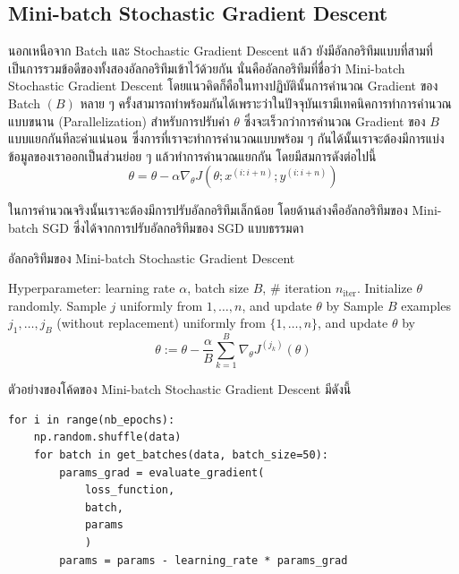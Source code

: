 \subsection{Mini-batch Stochastic Gradient Descent}
\label{ssec:minibatch_grad}

นอกเหนือจาก Batch และ Stochastic Gradient Descent แล้ว ยังมีอัลกอริทึมแบบที่สามที่เป็นการรวมข้อดีของทั้งสองอัลกอริทึมเข้าไว้ด้วยกัน นั่นคืออัลกอริทึมที่ชื่อว่า Mini-batch Stochastic Gradient Descent โดยแนวคิดก็คือในทางปฏิบัตินั้นการคำนวณ Gradient ของ Batch $(B)$ หลาย ๆ ครั้งสามารถทำพร้อมกันได้เพราะว่าในปัจจุบันเรามีเทคนิคการทำการคำนวณแบบขนาน (Parallelization) สำหรับการปรับค่า $\theta$ ซึ่งจะเร็วกว่าการคำนวณ Gradient ของ $B$ แบบแยกกันทีละค่าแน่นอน ซึ่งการที่เราจะทำการคำนวณแบบพร้อม ๆ กันได้นั้นเราจะต้องมีการแบ่งข้อมูลของเราออกเป็นส่วนย่อย ๆ แล้วทำการคำนวณแยกกัน โดยมีสมการดังต่อไปนี้
%
\begin{equation}\label{eq:minibatch}
    \theta = \theta - \alpha\nabla_\theta J( \theta; x^{(i:i+n)}; y^{(i:i+n)})
\end{equation}

ในการคำนวณจริงนั้นเราจะต้องมีการปรับอัลกอริทึมเล็กน้อย โดยด้านล่างคืออัลกอริทึมของ Mini-batch SGD ซึ่งได้จากการปรับอัลกอริทึมของ SGD แบบธรรมดา

\begin{algorithm}[H]
    \caption{อัลกอริทึมของ Mini-batch Stochastic Gradient Descent}
    \label{alg:minibatch}
    \begin{algorithmic}
        \State Hyperparameter: learning rate $\alpha$, batch size $B$, \# iteration $n_\text{iter}$.
        \State Initialize $\theta$ randomly.
        \State Sample $j$ uniformly from ${1,\ldots,n}$, and update $\theta$ by
        \State Sample $B$ examples $j_1,\ldots,j_B$ (without replacement) uniformly from $\{1,\ldots,n\}$,
        and update $\theta$ by
        \begin{equation*}
            \theta := \theta - \frac{\alpha}{B}\sum_{k=1}^B\nabla_\theta J^{(j_k)}(\theta)
        \end{equation*}
        \EndFor
    \end{algorithmic}
\end{algorithm}

\noindent ตัวอย่างของโค้ดของ Mini-batch Stochastic Gradient Descent มีดังนี้

\begin{lstlisting}[style=MyPython]
for i in range(nb_epochs):
    np.random.shuffle(data)
    for batch in get_batches(data, batch_size=50):
        params_grad = evaluate_gradient(
            loss_function, 
            batch, 
            params
            )
        params = params - learning_rate * params_grad
\end{lstlisting}

